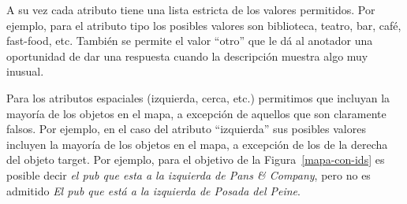A su vez cada atributo tiene una lista estricta de los valores permitidos. Por ejemplo, para el atributo tipo los posibles valores son biblioteca, teatro, bar, caf\'e, fast-food, etc. Tambi\'en se permite el valor ``otro'' que le d\'a al anotador una oportunidad de dar una respuesta cuando la descripci\'on muestra algo muy inusual.

Para los atributos espaciales (izquierda, cerca, etc.) permitimos que incluyan la mayor\'{i}a de los objetos en el mapa, a excepci\'on de aquellos que son claramente falsos. Por ejemplo, en el caso del atributo ``izquierda'' sus posibles valores incluyen la mayor\'{i}a de los objetos en el mapa, a excepci\'on de los de la derecha del objeto target. Por ejemplo, para el objetivo de la Figura~\ref{mapa-con-ids} es posible decir {\it el pub que esta a la izquierda de Pans \& Company}, pero no es admitido {\it El pub que est\'a a la izquierda de Posada del Peine}.
%






